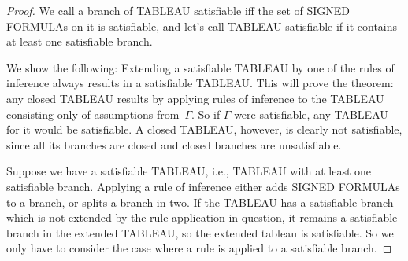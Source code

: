 \documentclass[10pt,a4paper]{article}
\newcommand*{\olup}[1]{\MakeUppercase{#1}}
\theoremstyle{plain}
\theoremstyle{definition}
\theoremstyle{remark}
\begin{document}
\begin{proof}
We call a branch of \olup{tableau} satisfiable iff the set of
\olup{signed formula}s on it is satisfiable, and let's call \olup{tableau}
satisfiable if it contains at least one satisfiable branch.

We show the following: Extending a satisfiable \olup{tableau} by one of
the rules of inference always results in a satisfiable \olup{tableau}.
This will prove the theorem: any closed \olup{tableau} results by
applying rules of inference to the \olup{tableau} consisting only of
assumptions from~$\Gamma$. So if $\Gamma$ were satisfiable, any
\olup{tableau} for it would be satisfiable. A closed \olup{tableau},
however, is clearly not satisfiable, since all its branches are closed
and closed branches are unsatisfiable.

Suppose we have a satisfiable \olup{tableau}, i.e., \olup{tableau} with at
least one satisfiable branch. Applying a rule of inference either adds
\olup{signed formula}s to a branch, or splits a branch in two. If the
\olup{tableau} has a satisfiable branch which is not extended by the rule
application in question, it remains a satisfiable branch in the
extended \olup{tableau}, so the extended tableau is satisfiable. So we
only have to consider the case where a rule is applied to a
satisfiable branch.


\end{proof}
\end{document}
